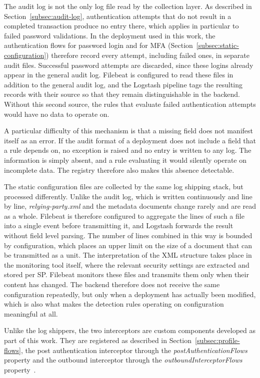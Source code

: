 \documentclass[../main.tex]{subfiles}
\begin{document}
The audit log is not the only log file read by the collection layer. 
As described in Section~\ref{subsec:audit-log}, authentication attempts that do not 
result in a completed transaction produce no entry there, which applies in particular 
to failed password validations. 
In the deployment used in this work, the authentication flows for password login and 
for MFA (Section~\ref{subsec:static-configuration}) therefore record every 
attempt, including failed ones, in separate audit files. 
Successful password attempts are discarded, since these logins already appear in the 
general audit log. 
Filebeat is configured to read these files in addition to the general audit log, and the 
Logstash pipeline tags the resulting records with their source so that they remain 
distinguishable in the backend. 
Without this second source, the rules that evaluate failed authentication attempts would 
have no data to operate on. 

A particular difficulty of this mechanism is that a missing field does not manifest 
itself as an error. 
If the audit format of a deployment does not include a field that a rule depends on, 
no exception is raised and no entry is written to any log. 
The information is simply absent, and a rule evaluating it would silently operate on 
incomplete data. 
The registry therefore also makes this absence detectable. 

The static configuration files are collected by the same log shipping stack, but 
processed differently. 
Unlike the audit log, which is written continuously and line by line, 
\textit{relying-party.xml} and the metadata documents change rarely and are read 
as a whole. 
Filebeat is therefore configured to aggregate the lines of such a file into a single 
event before transmitting it, and Logstash forwards the result without field level 
parsing. 
The number of lines combined in this way is bounded by configuration, which places an 
upper limit on the size of a document that can be transmitted as a unit. 
The interpretation of the XML structure takes place in the monitoring tool itself, 
where the relevant security settings are extracted and stored per SP. 
Filebeat monitors these files and transmits them only when their content has changed. 
The backend therefore does not receive the same configuration repeatedly, but only when a 
deployment has actually been modified, which is also what makes the detection rules operating on 
configuration meaningful at all. 

Unlike the log shippers, the two interceptors are custom components developed as part of this work. 
They are registered as described in Section~\ref{subsec:profile-flows}, the post authentication 
interceptor through the \textit{postAuthenticationFlows} property and the outbound interceptor 
through the \textit{outboundInterceptorFlows} property~\cite{ProfileInterceptConfiguration}. 
\end{document}
